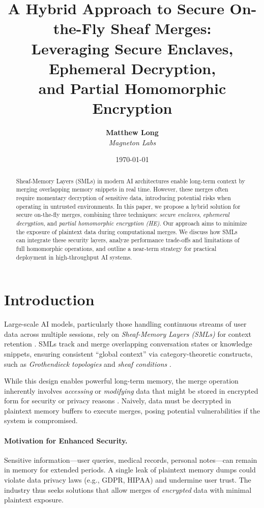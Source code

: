 \documentclass{article}
\title{%
A Hybrid Approach to Secure On-the-Fly Sheaf Merges:\\
Leveraging Secure Enclaves, Ephemeral Decryption, \\
and Partial Homomorphic Encryption
}
\author{
  \textbf{Matthew Long}\\
  \textit{Magneton Labs}
}
\date{\today}
\begin{document}
\maketitle

\begin{abstract}
Sheaf-Memory Layers (SMLs) in modern AI architectures enable long-term context by merging overlapping memory snippets in real time. However, these merges often require momentary decryption of sensitive data, introducing potential risks when operating in untrusted environments. In this paper, we propose a hybrid solution for secure on-the-fly merges, combining three techniques: \emph{secure enclaves}, \emph{ephemeral decryption}, and \emph{partial homomorphic encryption (HE)}. Our approach aims to minimize the exposure of plaintext data during computational merges. We discuss how SMLs can integrate these security layers, analyze performance trade-offs and limitations of full homomorphic operations, and outline a near-term strategy for practical deployment in high-throughput AI systems. 
\end{abstract}

\section{Introduction}
\label{sec:intro}

Large-scale AI models, particularly those handling continuous streams of user data across multiple sessions, rely on \emph{Sheaf-Memory Layers (SMLs)} for context retention \citep{sheafmemory2023design}. SMLs track and merge overlapping conversation states or knowledge snippets, ensuring consistent “global context” via category-theoretic constructs, such as \emph{Grothendieck topologies} and \emph{sheaf conditions} \citep{grothendieck1972, maclane1971categories}. 

While this design enables powerful long-term memory, the merge operation inherently involves \emph{accessing} or \emph{modifying} data that might be stored in encrypted form for security or privacy reasons \citep{kanMemory2024}. Naively, data must be decrypted in plaintext memory buffers to execute merges, posing potential vulnerabilities if the system is compromised.

\paragraph{Motivation for Enhanced Security.}
Sensitive information—user queries, medical records, personal notes—can remain in memory for extended periods. A single leak of plaintext memory dumps could violate data privacy laws (e.g., GDPR, HIPAA) and undermine user trust. The industry thus seeks solutions that allow merges of \emph{encrypted} data with minimal plaintext exposure.
\end{document}
